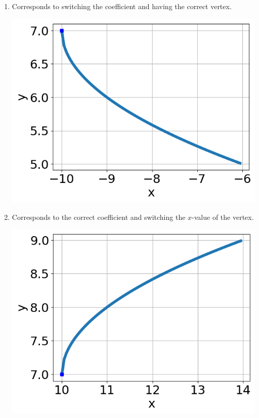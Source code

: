 \documentclass{article}[10pt]
\begin{document}
\begin{enumerate}[label=\Alph*.]
\item Corresponds to switching the coefficient and having the correct vertex. 
\begin{center}\includegraphics[scale=0.5]{../Figures/question23BC.png}\end{center} 
 
\item Corresponds to the correct coefficient and switching the $x$-value of the vertex. 
\begin{center}\includegraphics[scale=0.5]{../Figures/question23BB.png}\end{center} 
 

\end{enumerate}
\end{document}
